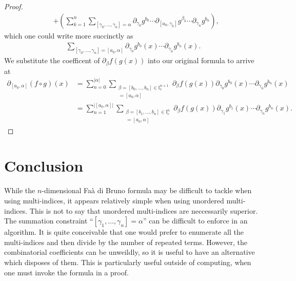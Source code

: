 \documentclass[12pt]{amsart}
\begin{document}
\begin{proof}
\begin{align*}
& +
 \left( \sum_{k=1}^{n} \sum_{ [\gamma_0, \dots,\gamma_n] = \alpha}
  \partial_{\gamma_0}g^{b_0} \cdots \partial_{[a_0,\gamma_k]} g^{\beta_k} \cdots \partial_{\gamma_n} g^{b_n}\right),
\end{align*}
which one could write more succinctly as
\begin{align*}
  \sum_{[\gamma_0,\dots,\gamma_n] = [a_0,\alpha]}
  \partial_{\gamma_0}g^{b_0}(x)
  \cdots
  \partial_{\gamma_n}g^{b_n}(x).
\end{align*}
We substitute the coefficent of
$\partial_{\beta} f(g(x))$ into our original formula to arrive at
\begin{align*}
  \partial_{[a_0,\alpha]}( f \circ g)(x) &= \sum_{n=0}^{|\alpha |} \sum_{
    \substack{
      \beta = [b_0,\dots,b_n] \in \mathbb{I}_c^{n+1}\\
      [\gamma_0,\dots,\gamma_n] = [a_0,\alpha]      
      }
    }\partial_{\beta}f(g(x)) \partial_{\gamma_0}g^{b_0}(x) \cdots \partial_{\gamma_n}g^{b_n}(x) \\
  &=\sum_{n=1}^{|[a_0,\alpha] |} \sum_{
    \substack{
      \beta = [b_1,\dots,b_n] \in \mathbb{I}_c^{n}\\
      [\gamma_1,\dots,\gamma_n] = [a_0,\alpha]      
      }
    }\partial_{\beta}f(g(x)) \partial_{\gamma_1}g^{b_1}(x) \cdots \partial_{\gamma_n}g^{b_n}(x).
\end{align*}
\end{proof}


\section{Conclusion}
While the $n$-dimensional Fa\`a di Bruno formula may be difficult
to tackle when using multi-indices, it appears
relatively simple when using unordered multi-indices.
This is not to say that unordered multi-indices are neccessarily
superior.
The summation constraint
``$[\gamma_1,\dots,\gamma_n] = \alpha$''
can be difficult to enforce in an algorithm.
It is quite conceivable that one would prefer to 
enumerate all the multi-indices and then divide by the 
number of repeated terms.
However, the combinatorial coefficients can be unweildly,
so it is useful to have an alternative which disposes of them.
This is particularly useful outside of computing,
when one must invoke the formula in a proof.



\end{document}
